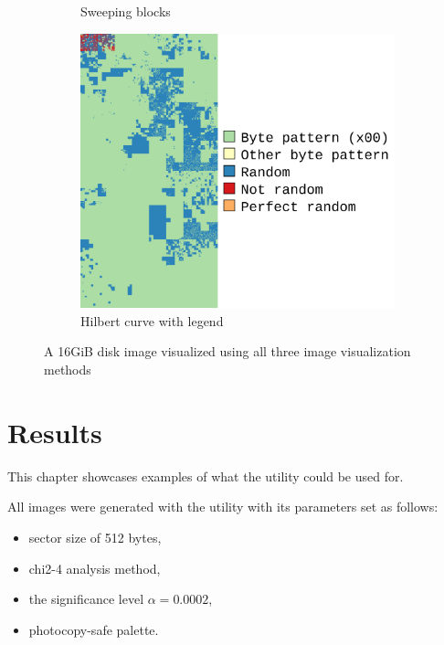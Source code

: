 \documentclass[
  digital, %
  color,   %
  oneside, %
  lof,     %
  nolot,     %
]{fithesis4}
\begin{document}
\begin{figure}
\begin{subfigure}[t]{.45\textwidth}
        \caption{Sweeping blocks}
        \label{fig:impl-sweeping-blocks}
    \end{subfigure}
    \begin{subfigure}[t]{.6\textwidth}
        \centering
        \includegraphics[width=\textwidth,interpolate=false]{pv204_fde-chi2-4-hilbert.png}
        \caption{Hilbert curve with legend}
        \label{fig:impl-hilbert-curve}
    \end{subfigure}
    \caption{A 16GiB disk image visualized using all three image visualization methods}
    \label{fig:impl-visualizations}
\end{figure}

\chapter{Results}
\label{chap:results}
This chapter showcases examples of what the utility could be used for.

All images were generated with the utility with its parameters set as follows:
\begin{itemize}
  \item sector size of 512 bytes,
  \item chi2-4 analysis method,
  \item the significance level $\alpha = 0.0002$,
  \item photocopy-safe palette.
\end{itemize}
\end{document}
